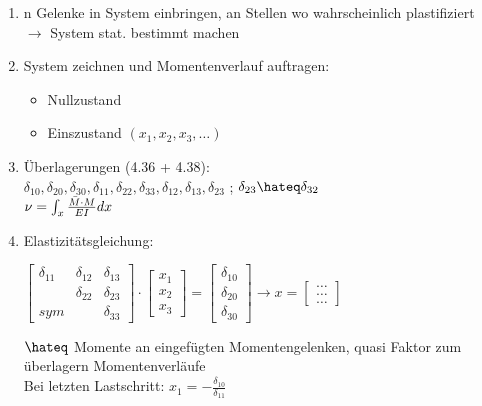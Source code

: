 \documentclass[fleqn,twoside]{article}
\begin{document}
        \begin{enumerate}
            \item n Gelenke in System einbringen, an Stellen wo wahrscheinlich plastifiziert \\ $\rightarrow$ System stat. bestimmt machen
            \item System zeichnen und Momentenverlauf auftragen:
                \begin{itemize}
                    \item Nullzustand
                    \item Einszustand $(x_1, x_2, x_3,\ldots)$
                \end{itemize}
            \item Überlagerungen (4.36 + 4.38): \\
                $\delta_{10}, \delta_{20}, \delta_{30}, \delta_{11}, \delta_{22}, \delta_{33}, \delta_{12}, \delta_{13}, \delta_{23}$ ; $\delta_{23} \hateq \delta_{32}$  \\
                $\nu = \int_x \frac{\Bar{M} \cdot M}{EI} dx$
            \item Elastizitätsgleichung:\\
                \begin{minipage}{0.50\textwidth}
                    $ \begin{bmatrix} \delta_{11} & \delta_{12} & \delta_{13} \\  & \delta_{22} & \delta_{23} \\ sym &  & \delta_{33} \end{bmatrix}  
                    \cdot
                    \begin{bmatrix} x_1 \\ x_2 \\ x_3 \end{bmatrix}
                    =
                    \begin{bmatrix} \delta_{10} \\ \delta_{20} \\ \delta_{30} \end{bmatrix}
                    \rightarrow x = \begin{bmatrix} \ldots \\ \ldots \\ \ldots \end{bmatrix}$
                \end{minipage}
                \begin{minipage}{0.50\textwidth}
                    $\hateq$ Momente an eingefügten Momentengelenken, quasi Faktor zum überlagern Momentenverläufe\\
                Bei letzten Lastschritt: $x_1 = - \frac{\delta_{10}}{\delta_{11}}$
                \end{minipage}
                 

\end{enumerate}
\end{document}
